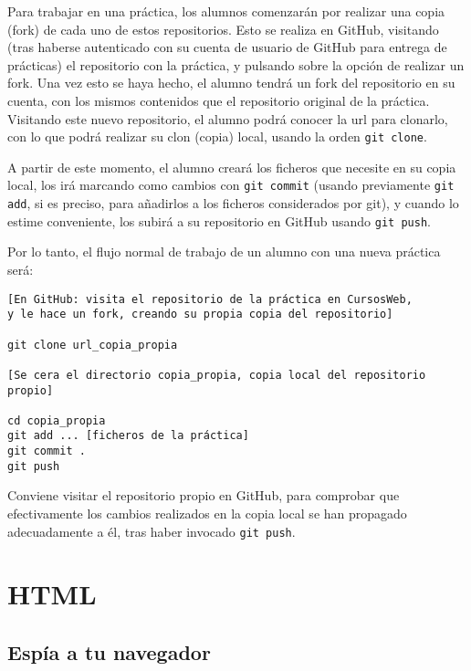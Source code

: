 Para trabajar en una práctica, los alumnos comenzarán por realizar una copia (fork) de cada uno de estos repositorios. Esto se realiza en GitHub, visitando (tras haberse autenticado con su cuenta de usuario de GitHub para entrega de prácticas) el repositorio con la práctica, y pulsando sobre la opción de realizar un fork. Una vez esto se haya hecho, el alumno tendrá un fork del repositorio en su cuenta, con los mismos contenidos que el repositorio original de la práctica. Visitando este nuevo repositorio, el alumno podrá conocer la url para clonarlo, con lo que podrá realizar su clon (copia) local, usando la orden \verb|git clone|.

A partir de este momento, el alumno creará los ficheros que necesite en su copia local, los irá marcando como cambios con \verb|git commit| (usando previamente \verb|git add|, si es preciso, para añadirlos a los ficheros considerados por git), y cuando lo estime conveniente, los subirá a su repositorio en GitHub usando \verb|git push|.

Por lo tanto, el flujo normal de trabajo de un alumno con una nueva práctica será:

\begin{verbatim}
[En GitHub: visita el repositorio de la práctica en CursosWeb,
y le hace un fork, creando su propia copia del repositorio]

git clone url_copia_propia

[Se cera el directorio copia_propia, copia local del repositorio propio]

cd copia_propia
git add ... [ficheros de la práctica]
git commit .
git push
\end{verbatim}

Conviene visitar el repositorio propio en GitHub, para comprobar que efectivamente los cambios realizados en la copia local se han propagado adecuadamente a él, tras haber invocado \verb|git push|.

\section{HTML}

\subsection{Espía a tu navegador}
\label{subsec:eje-firebug}

